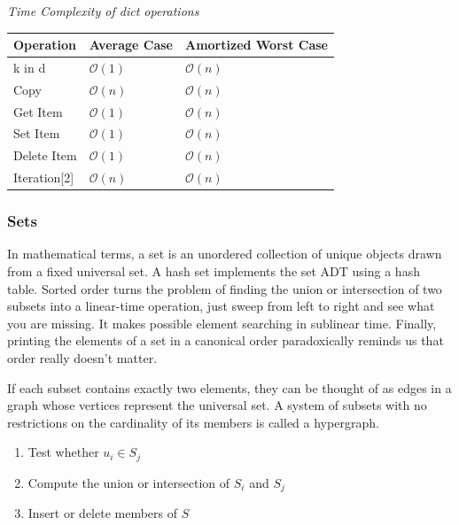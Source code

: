 \documentclass{article}
\newcommand{\bigO}{\mathcal{O}}
\begin{document}
   \vspace{8pt} \emph{Time Complexity of dict operations}
    \begin{table}[H]
        \begin{tabular}{|l|l|l|}
            \hline
            \textbf{Operation} & \textbf{Average Case} & \textbf{Amortized Worst Case} \\
            \hline
            k in d & $\bigO(1)$ & $\bigO(n)$ \\
            Copy & $\bigO(n)$ & $\bigO(n)$ \\
            Get Item & $\bigO(1)$ & $\bigO(n)$ \\
            Set Item & $\bigO(1)$ & $\bigO(n)$ \\
            Delete Item & $\bigO(1)$ & $\bigO(n)$ \\
            Iteration[2] & $\bigO(n)$ & $\bigO(n)$ \\
            \hline
        \end{tabular}
    \end{table}
    
    \subsubsection{Sets}
    In mathematical terms, a set is an unordered collection of unique objects drawn from a fixed universal set. A hash set implements the set ADT using a hash table. Sorted order turns the problem of finding the union or intersection of two subsets into a linear-time operation, just sweep from left to right and see what you are missing. It makes possible element searching in sublinear time. Finally, printing the elements of a set in a canonical order paradoxically reminds us that order really doesn’t matter.
     
    If each subset contains exactly two elements, they can be thought of as edges in a graph whose vertices represent the universal set. A system of subsets with no restrictions on the cardinality of its members is called a hypergraph.
    
    \begin{enumerate}
        \item Test whether $u_i \in S_j$
        \item Compute the union or intersection of $S_i$ and $S_j$
        \item Insert or delete members of $S$
    \end{enumerate}
    
\end{document}
